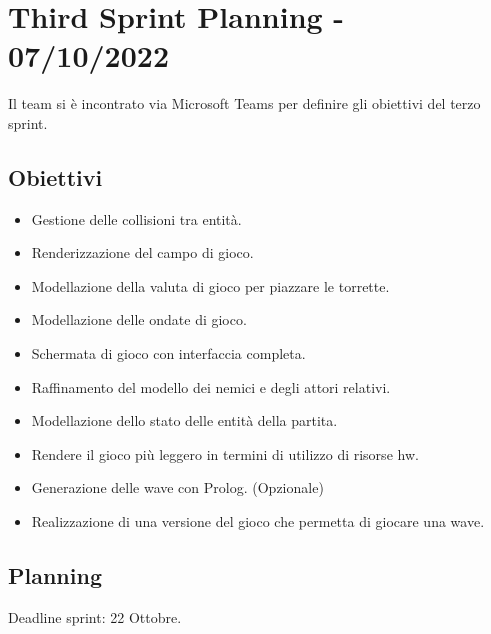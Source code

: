 \section*{Third Sprint Planning - 07/10/2022}
Il team si è incontrato via Microsoft Teams per definire gli obiettivi del terzo sprint.

\subsection*{Obiettivi}
\begin{itemize}
    \item Gestione delle collisioni tra entità.
    \item Renderizzazione del campo di gioco.
    \item Modellazione della valuta di gioco per piazzare le torrette.
    \item Modellazione delle ondate di gioco.
    \item Schermata di gioco con interfaccia completa.
    \item Raffinamento del modello dei nemici e degli attori relativi.
    \item Modellazione dello stato delle entità della partita.
    \item Rendere il gioco più leggero in termini di utilizzo di risorse hw.
    \item Generazione delle wave con Prolog. (Opzionale)
    \item Realizzazione di una versione del gioco che permetta di giocare una wave.
\end{itemize}

\subsection*{Planning}
Deadline sprint: 22 Ottobre.

